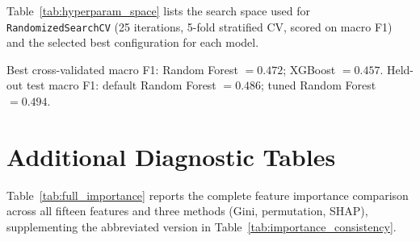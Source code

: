 \documentclass[conference]{IEEEtran}
\begin{document}
\begin{table}[h]
\caption{Hyperparameter Search Space and Selected Values}
\label{tab:hyperparam_space}
\centering
{}
\end{table}
Table~\ref{tab:hyperparam_space} lists the search space used for \texttt{RandomizedSearchCV} (25 iterations, 5-fold stratified CV, scored on macro F1) and the selected best configuration for each model.
 
Best cross-validated macro F1: Random Forest $=0.472$; XGBoost $=0.457$. Held-out test macro F1: default Random Forest $=0.486$; tuned Random Forest $=0.494$.
 
\section{Additional Diagnostic Tables}
\label{sec:appendix_additional_diagnostic_tables}
Table~\ref{tab:full_importance} reports the complete feature importance comparison across all fifteen features and three methods (Gini, permutation, SHAP), supplementing the abbreviated version in Table~\ref{tab:importance_consistency}.
 
\end{document}

